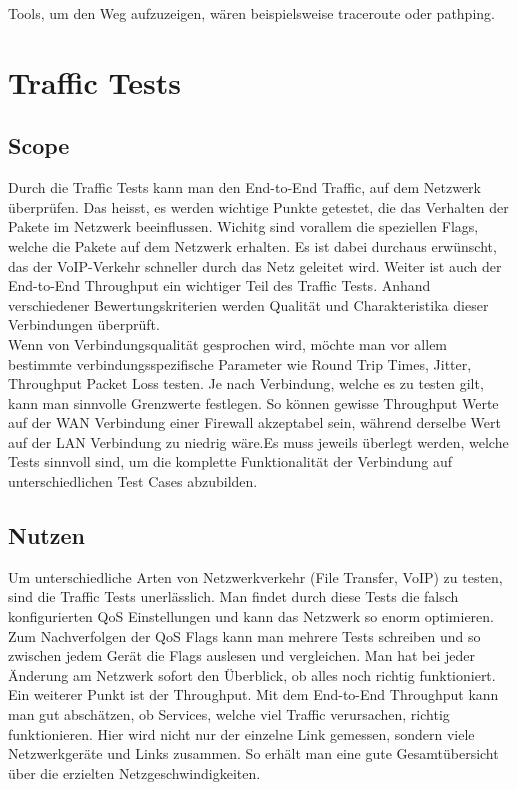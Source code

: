 \documentclass[a4,12pt]{scrartcl}
\begin{document}
\noindent Tools, um den Weg aufzuzeigen, wären beispielsweise traceroute oder pathping.  
\section{Traffic Tests}
\subsection{Scope}
Durch die Traffic Tests kann man den End-to-End Traffic, auf dem Netzwerk überprüfen. Das heisst, es werden wichtige Punkte getestet, die das Verhalten der Pakete im Netzwerk beeinflussen. Wichitg sind vorallem die speziellen Flags, welche die Pakete auf dem Netzwerk erhalten. Es ist dabei durchaus erwünscht, das der VoIP-Verkehr schneller durch das Netz geleitet wird.\newline
Weiter ist auch der End-to-End Throughput ein wichtiger Teil des Traffic Tests. Anhand verschiedener Bewertungskriterien werden Qualität und Charakteristika dieser Verbindungen überprüft.\\

\noindent Wenn von Verbindungsqualität gesprochen wird, möchte man vor allem bestimmte verbindungsspezifische Parameter wie Round Trip Times, Jitter, Throughput Packet Loss testen. Je nach Verbindung, welche es zu testen gilt, kann man sinnvolle Grenzwerte festlegen. So können gewisse Throughput Werte auf der WAN Verbindung einer Firewall akzeptabel sein, während derselbe Wert auf der LAN Verbindung zu niedrig wäre.Es muss jeweils überlegt werden, welche Tests sinnvoll sind, um die komplette Funktionalität der Verbindung auf unterschiedlichen Test Cases abzubilden.
\subsection{Nutzen}
Um unterschiedliche Arten von Netzwerkverkehr (File Transfer, VoIP) zu testen, sind die Traffic Tests unerlässlich. Man findet durch diese Tests die falsch konfigurierten QoS Einstellungen und kann das Netzwerk so enorm optimieren. 
Zum Nachverfolgen der QoS Flags kann man mehrere Tests schreiben und so zwischen jedem Gerät die Flags auslesen und vergleichen.\newline\newline
Man hat bei jeder Änderung am Netzwerk sofort den Überblick, ob alles noch richtig funktioniert.\newline\newline
Ein weiterer Punkt ist der Throughput. Mit dem End-to-End Throughput kann man gut abschätzen, ob Services, welche viel Traffic verursachen, richtig funktionieren. Hier wird nicht nur der einzelne Link gemessen, sondern viele Netzwerkgeräte und Links zusammen. So erhält man eine gute Gesamtübersicht über die erzielten Netzgeschwindigkeiten.\\
\end{document}
